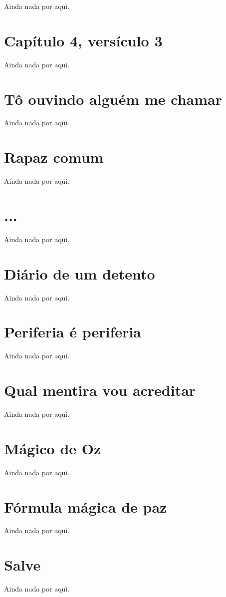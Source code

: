Ainda nada por aqui.
			
\section{Capítulo 4, versículo 3}

Ainda nada por aqui.

\section{Tô ouvindo alguém me chamar}

Ainda nada por aqui.
			
\section{Rapaz comum}

Ainda nada por aqui.
			
\section{...}

Ainda nada por aqui.
			
\section{Diário de um detento}

Ainda nada por aqui.
			
\section{Periferia é periferia}

Ainda nada por aqui.
			
\section{Qual mentira vou acreditar}

Ainda nada por aqui.
			
\section{Mágico de Oz}

Ainda nada por aqui.
			
\section{Fórmula mágica de paz}

Ainda nada por aqui.
			
\section{Salve}

Ainda nada por aqui.